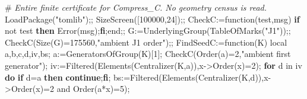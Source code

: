 \documentclass[
  10pt,
  letterpaper,
]{article}
\newenvironment{Shaded}{}{}
\newcommand{\BuiltInTok}[1]{\textcolor[rgb]{0.00,0.50,0.00}{#1}}
\newcommand{\CommentTok}[1]{\textcolor[rgb]{0.38,0.63,0.69}{\textit{#1}}}
\newcommand{\ConstantTok}[1]{\textcolor[rgb]{0.53,0.00,0.00}{#1}}
\newcommand{\ControlFlowTok}[1]{\textcolor[rgb]{0.00,0.44,0.13}{\textbf{#1}}}
\newcommand{\ExtensionTok}[1]{#1}
\newcommand{\FloatTok}[1]{\textcolor[rgb]{0.25,0.63,0.44}{#1}}
\newcommand{\FunctionTok}[1]{\textcolor[rgb]{0.02,0.16,0.49}{#1}}
\newcommand{\NormalTok}[1]{#1}
\newcommand{\OperatorTok}[1]{\textcolor[rgb]{0.40,0.40,0.40}{#1}}
\newcommand{\StringTok}[1]{\textcolor[rgb]{0.25,0.44,0.63}{#1}}
\newcommand{\VariableTok}[1]{\textcolor[rgb]{0.10,0.09,0.49}{#1}}
\begin{document}
\begin{Shaded}
\begin{Highlighting}[]
\NormalTok{\#}\CommentTok{ Entire finite certificate for Compress\_C. No geometry census is read.}
\BuiltInTok{LoadPackage}\NormalTok{(}\StringTok{"tomlib"}\NormalTok{)}\OperatorTok{;;}
\BuiltInTok{SizeScreen}\NormalTok{([}\FloatTok{100000}\OperatorTok{,}\FloatTok{24}\NormalTok{])}\OperatorTok{;;}
\VariableTok{CheckC}\OperatorTok{:=}\FunctionTok{function}\NormalTok{(}\VariableTok{test}\OperatorTok{,}\VariableTok{msg}\NormalTok{) }\ControlFlowTok{if} \ConstantTok{not} \VariableTok{test} \ControlFlowTok{then} \BuiltInTok{Error}\NormalTok{(}\VariableTok{msg}\NormalTok{)}\OperatorTok{;}\ControlFlowTok{fi}\OperatorTok{;}\FunctionTok{end}\OperatorTok{;;}
\VariableTok{G}\OperatorTok{:=}\BuiltInTok{UnderlyingGroup}\NormalTok{(}\BuiltInTok{TableOfMarks}\NormalTok{(}\StringTok{"J1"}\NormalTok{))}\OperatorTok{;;}
\VariableTok{CheckC}\NormalTok{(}\BuiltInTok{Size}\NormalTok{(}\VariableTok{G}\NormalTok{)}\OperatorTok{=}\FloatTok{175560}\OperatorTok{,}\StringTok{"ambient J1 order"}\NormalTok{)}\OperatorTok{;;}
\VariableTok{FindSeedC}\OperatorTok{:=}\FunctionTok{function}\NormalTok{(}\VariableTok{K}\NormalTok{)}
 \ExtensionTok{local} \VariableTok{a}\OperatorTok{,}\VariableTok{b}\OperatorTok{,}\VariableTok{c}\OperatorTok{,}\VariableTok{d}\OperatorTok{,}\VariableTok{iv}\OperatorTok{,}\VariableTok{bs}\OperatorTok{;}
 \VariableTok{a}\OperatorTok{:=}\BuiltInTok{GeneratorsOfGroup}\NormalTok{(}\VariableTok{K}\NormalTok{)[}\FloatTok{1}\NormalTok{]}\OperatorTok{;}
 \VariableTok{CheckC}\NormalTok{(}\BuiltInTok{Order}\NormalTok{(}\VariableTok{a}\NormalTok{)}\OperatorTok{=}\FloatTok{2}\OperatorTok{,}\StringTok{"ambient first generator"}\NormalTok{)}\OperatorTok{;}
 \VariableTok{iv}\OperatorTok{:=}\BuiltInTok{Filtered}\NormalTok{(}\BuiltInTok{Elements}\NormalTok{(}\BuiltInTok{Centralizer}\NormalTok{(}\VariableTok{K}\OperatorTok{,}\VariableTok{a}\NormalTok{))}\OperatorTok{,}\VariableTok{x}\OperatorTok{{-}\textgreater{}}\BuiltInTok{Order}\NormalTok{(}\VariableTok{x}\NormalTok{)}\OperatorTok{=}\FloatTok{2}\NormalTok{)}\OperatorTok{;}
 \ControlFlowTok{for} \VariableTok{d} \ExtensionTok{in} \VariableTok{iv} \ControlFlowTok{do}
  \ControlFlowTok{if} \VariableTok{d}\OperatorTok{=}\VariableTok{a} \ControlFlowTok{then} \ControlFlowTok{continue}\OperatorTok{;}\ControlFlowTok{fi}\OperatorTok{;}
  \VariableTok{bs}\OperatorTok{:=}\BuiltInTok{Filtered}\NormalTok{(}\BuiltInTok{Elements}\NormalTok{(}\BuiltInTok{Centralizer}\NormalTok{(}\VariableTok{K}\OperatorTok{,}\VariableTok{d}\NormalTok{))}\OperatorTok{,}\VariableTok{x}\OperatorTok{{-}\textgreater{}}\BuiltInTok{Order}\NormalTok{(}\VariableTok{x}\NormalTok{)}\OperatorTok{=}\FloatTok{2} \ConstantTok{and} \BuiltInTok{Order}\NormalTok{(}\VariableTok{a}\OperatorTok{*}\VariableTok{x}\NormalTok{)}\OperatorTok{=}\FloatTok{5}\NormalTok{)}\OperatorTok{;}

\end{Highlighting}
\end{Shaded}
\end{document}
